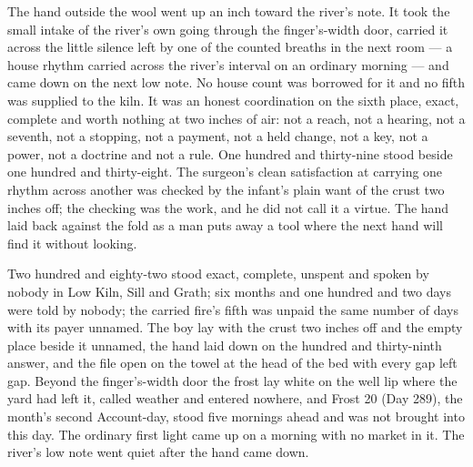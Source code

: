 The hand outside the wool went up an inch toward the river's note. It took the small intake of the river's own going through the finger's-width door, carried it across the little silence left by one of the counted breaths in the next room --- a house rhythm carried across the river's interval on an ordinary morning --- and came down on the next low note. No house count was borrowed for it and no fifth was supplied to the kiln. It was an honest coordination on the sixth place, exact, complete and worth nothing at two inches of air: not a reach, not a hearing, not a seventh, not a stopping, not a payment, not a held change, not a key, not a power, not a doctrine and not a rule. One hundred and thirty-nine stood beside one hundred and thirty-eight. The surgeon's clean satisfaction at carrying one rhythm across another was checked by the infant's plain want of the crust two inches off; the checking was the work, and he did not call it a virtue. The hand laid back against the fold as a man puts away a tool where the next hand will find it without looking.

Two hundred and eighty-two stood exact, complete, unspent and spoken by nobody in Low Kiln, Sill and Grath; six months and one hundred and two days were told by nobody; the carried fire's fifth was unpaid the same number of days with its payer unnamed. The boy lay with the crust two inches off and the empty place beside it unnamed, the hand laid down on the hundred and thirty-ninth answer, and the file open on the towel at the head of the bed with every gap left gap. Beyond the finger's-width door the frost lay white on the well lip where the yard had left it, called weather and entered nowhere, and Frost 20 (Day 289), the month's second Account-day, stood five mornings ahead and was not brought into this day. The ordinary first light came up on a morning with no market in it. The river's low note went quiet after the hand came down.
